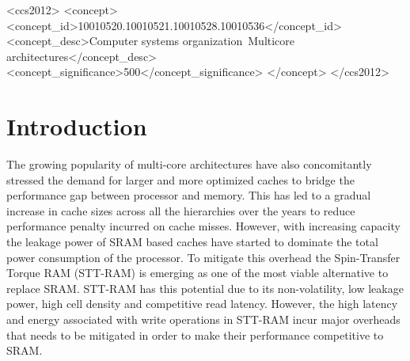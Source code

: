 \documentclass[sigconf]{acmart}
\begin{document}
\begin{CCSXML}
<ccs2012>
<concept>
<concept_id>10010520.10010521.10010528.10010536</concept_id>
<concept_desc>Computer systems organization~Multicore architectures</concept_desc>
<concept_significance>500</concept_significance>
</concept>
</ccs2012>
\end{CCSXML}







\maketitle

\section{Introduction}
The growing popularity of multi-core architectures have also concomitantly stressed the demand for larger and more optimized caches to bridge the performance gap between processor and memory. This has led to a gradual increase in cache sizes across all the hierarchies over the years to reduce performance penalty incurred on cache misses. However, with increasing capacity the leakage power of SRAM based caches have started to dominate the total power consumption of the processor. To mitigate this overhead the Spin-Transfer Torque RAM (STT-RAM) is emerging as one of the most viable alternative to replace SRAM. STT-RAM has this potential due to its non-volatility, low leakage power, high cell density and competitive read latency. However, the high latency and energy associated with write operations in STT-RAM incur major overheads that needs to be mitigated in order to make their performance competitive to SRAM.
    
\end{document}
